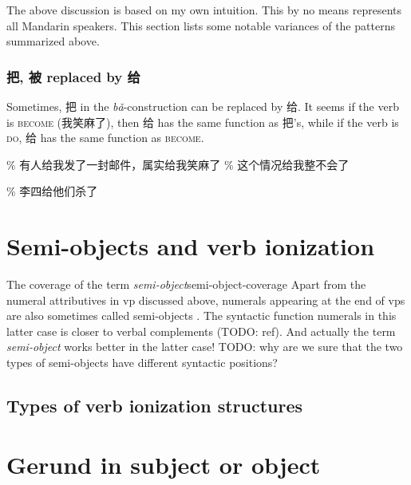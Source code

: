 \documentclass[UTF8, a4paper, oneside, scheme=plain, 12pt]{ctexrep}
\newcommand*{\citepage}[1]{p.~{#1}}
\newcommand*{\term}[1]{\emph{#1}}
\newcommand{\form}[1]{\emph{#1}}
\newcommand*{\category}[1]{\textsc{#1}}
\begin{document}
The above discussion is based on my own intuition.
This by no means represents all Mandarin speakers. 
This section lists some notable variances of the patterns summarized above. 

\subsubsection{把, 被 replaced by 给}

Sometimes, 把 in the \form{bǎ}-construction can be replaced by 给.
It seems if the verb is \category{become} (我笑麻了),
then 给 has the same function as 把's, 
while if the verb is \category{do},
给 has the same function as \category{become}.

\begin{exe}
    \ex \% 有人给我发了一封邮件，属实给我笑麻了
    \ex \% 这个情况给我整不会了
\end{exe}

\begin{exe}
    \ex\label{ex:verb-phrase.gei.2} \% 李四给他们杀了
\end{exe}


\section{Semi-objects and verb ionization}\label{sec:verb-splitting}



\begin{infobox}{The coverage of the term \term{semi-object}}{semi-object-coverage}
    Apart from the numeral attributives in \acs{vp} discussed above, 
    numerals appearing at the end of \acs{vp}s 
    are also sometimes called semi-objects \citep[\citepage{117}]{deng2010formal}.
    The syntactic function numerals in this latter case 
    is closer to verbal complements (TODO: ref).
    And actually the term \term{semi-object} works better in the latter case!
    TODO: why are we sure that the two types of semi-objects have different syntactic positions?
\end{infobox}

\subsection{Types of verb ionization structures}





\section{Gerund in subject or object}
\end{document}
